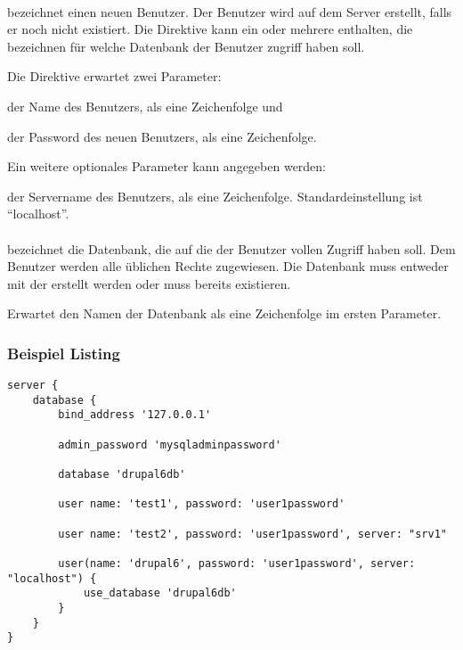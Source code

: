 \paragraph{}

bezeichnet einen neuen Benutzer. Der Benutzer wird auf dem Server erstellt, falls er
noch nicht existiert. Die Direktive kann ein oder mehrere 
enthalten, die bezeichnen für welche Datenbank der Benutzer zugriff haben soll.

Die Direktive erwartet zwei Parameter:

\begin{asparadesc}
\item[\code{name}] der Name des Benutzers, als eine Zeichenfolge und
\item[\code{password}] der Password des neuen Benutzers, als eine Zeichenfolge.
\end{asparadesc}

Ein weitere optionales Parameter kann angegeben werden:

\begin{asparadesc}
\item[\code{server}] der Servername des Benutzers, als eine Zeichenfolge. Standardeinstellung
ist ``localhost''.
\end{asparadesc}

\paragraph{}

bezeichnet die Datenbank, die auf die der Benutzer vollen Zugriff haben soll. Dem Benutzer
werden alle üblichen Rechte zugewiesen. Die Datenbank muss entweder mit der 
erstellt werden oder muss bereits existieren.

Erwartet den Namen der Datenbank als eine Zeichenfolge im ersten Parameter.

\subsubsection*{Beispiel Listing}

\begin{lstlisting}[style=Java, caption=Beispiel Database Script]
server {
	database {
		bind_address '127.0.0.1'

		admin_password 'mysqladminpassword'

		database 'drupal6db'

		user name: 'test1', password: 'user1password'

		user name: 'test2', password: 'user1password', server: "srv1"

		user(name: 'drupal6', password: 'user1password', server: "localhost") { 
			use_database 'drupal6db' 
		}
	}
}
\end{lstlisting}


